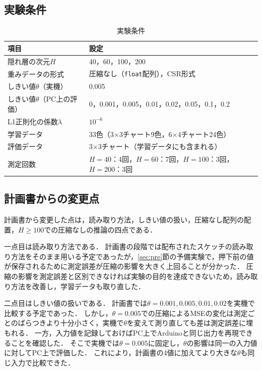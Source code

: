 \documentclass[a4paper,11pt,uplatex,dvipdfmx]{jsarticle}
\begin{document}
\subsection{実験条件}
\begin{table}[H]
  \centering
  \caption{実験条件}
  \label{tab:cond}
  \begin{tabular}{ll}
    \toprule
    項目 & 設定 \\
    \midrule
    隠れ層の次元$H$ & 40，60，100，200 \\
    重みデータの形式 & 圧縮なし（\texttt{float}配列），CSR形式 \\
    しきい値$\theta$（実機） & 0.005 \\
    しきい値$\theta$（PC上の評価） & 0，0.001，0.005，0.01，0.02，0.05，0.1，0.2 \\
    L1正則化の係数$\lambda$ & $10^{-6}$ \\
    学習データ & 33色（3$\times$3チャート9色，6$\times$4チャート24色） \\
    評価データ & 3$\times$3チャート（学習データにも含まれる） \\
    測定回数 & $H=40$：4回，$H=60$：7回，$H=100$：3回，$H=200$：3回 \\
    \bottomrule
  \end{tabular}
\end{table}

\subsection{計画書からの変更点}
計画書から変更した点は，読み取り方法，しきい値の扱い，圧縮なし配列の配置，$H \geq 100$での圧縮なしの推論の四点である．

一点目は読み取り方法である．
計画書の段階では配布されたスケッチの読み取り方法をそのまま用いる予定であったが，\ref{sec:pre}節の予備実験で，押下前の値が保存されるために測定誤差が圧縮の影響を大きく上回ることが分かった．
圧縮の影響を測定誤差と区別できなければ実験の目的を達成できないため，読み取り方法を改善し，学習データも取り直した．

二点目はしきい値の扱いである．
計画書では$\theta=0.001, 0.005, 0.01, 0.02$を実機で比較する予定であった．
しかし，$\theta=0.005$での圧縮によるMSEの変化は測定ごとのばらつきより十分小さく，実機で$\theta$を変えて測り直しても差は測定誤差に埋もれる．
一方，入力値を記録しておけばPC上でArduinoと同じ出力を再現できることを確認した．
そこで実機では$\theta=0.005$に固定し，$\theta$の影響は同一の入力値に対してPC上で評価した．
これにより，計画書の4値に加えてより大きな$\theta$も同じ入力で比較できた．
\end{document}
